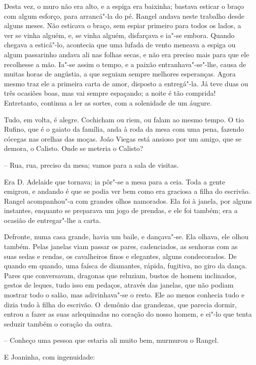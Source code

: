 Desta vez, o muro não era alto, e a espiga era baixinha; bastava esticar
o braço com algum esforço, para arrancá"-la do pé. Rangel andava neste
trabalho desde alguns meses. Não esticava o braço, sem espiar primeiro
para todos os lados, a ver se vinha alguém, e, se vinha alguém,
disfarçava e ia"-se embora. Quando chegava a esticá"-lo, acontecia que uma
lufada de vento meneava a espiga ou algum passarinho andava ali nas
folhas secas, e não era preciso mais para que ele recolhesse a mão.
Ia"-se assim o tempo, e a paixão entranhava"-se"-lhe, causa de muitas horas
de angústia, a que seguiam sempre melhores esperanças. Agora mesmo traz
ele a primeira carta de amor, disposto a entregá"-la. Já teve duas ou
três ocasiões boas, mas vai sempre espaçando; a noite é tão comprida!
Entretanto, continua a ler as sortes, com a solenidade de um áugure.

Tudo, em volta, é alegre. Cochicham ou riem, ou falam ao mesmo tempo. O
tio Rufino, que é o gaiato da família, anda à roda da mesa com uma pena,
fazendo cócegas nas orelhas das moças. João Viegas está ansioso por um
amigo, que se demora, o Calisto. Onde se meteria o Calisto?

-- Rua, rua, preciso da mesa; vamos para a sala de visitas.

Era D. Adelaide que tornava; ia pôr"-se a mesa para a ceia. Toda a gente
emigrou, e andando é que se podia ver bem como era graciosa a filha do
escrivão. Rangel acompanhou"-a com grandes olhos namorados. Ela foi à
janela, por alguns instantes, enquanto se preparava um jogo de prendas,
e ele foi também; era a ocasião de entregar"-lhe a carta.

Defronte, numa casa grande, havia um baile, e dançava"-se. Ela olhava,
ele olhou também. Pelas janelas viam passar os pares, cadenciados, as
senhoras com as suas sedas e rendas, os cavalheiros finos e elegantes,
alguns condecorados. De quando em quando, uma faísca de diamantes,
rápida, fugitiva, no giro da dança. Pares que conversavam, dragonas que
reluziam, bustos de homem inclinados, gestos de leques, tudo isso em
pedaços, através das janelas, que não podiam mostrar todo o salão, mas
adivinhava"-se o resto. Ele ao menos conhecia tudo e dizia tudo à filha
do escrivão. O~demônio das grandezas, que parecia dormir, entrou a fazer
as suas arlequinadas no coração do nosso homem, e ei"-lo que tenta
seduzir também o coração da outra.

-- Conheço uma pessoa que estaria ali muito bem, murmurou o Rangel.

E Joaninha, com ingenuidade:


